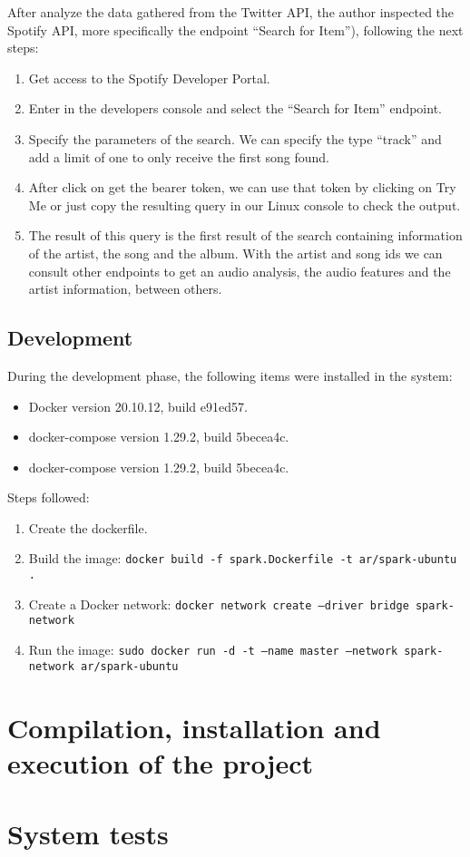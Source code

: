\nonzeroparskip After analyze the data gathered from the Twitter API,  the author inspected the Spotify API, more specifically the endpoint ``Search for Item''), following the next steps:
\begin{enumerate}
	\item Get access to the Spotify Developer Portal.
	\item Enter in the developers console and select the ``Search for Item'' endpoint.
	\item Specify the parameters of the search. We can specify the type ``track'' and add a limit of one to only receive the first song found.
	\item After click on get the bearer token, we can use that token by clicking on Try Me or just copy the resulting query in our Linux console to check the output.
	\item The result of this query is the first result of the search containing information of the artist, the song and the album. With the artist and song ids we can consult other endpoints to get an audio analysis, the audio features and the artist information, between others.
\end{enumerate}

\subsection{Development}
\nonzeroparskip During the development phase, the following items were installed in the system:
\begin{itemize}
	\item Docker version 20.10.12, build e91ed57.
	\item docker-compose version 1.29.2, build 5becea4c.
	\item docker-compose version 1.29.2, build 5becea4c.
\end{itemize}

\nonzeroparskip Steps followed:
\begin{enumerate}
	\item Create the dockerfile.
	\item Build the image:  \texttt{docker build -f spark.Dockerfile -t ar/spark-ubuntu .}
	\item Create a Docker network: \texttt{docker network create --driver bridge spark-network}
	\item Run the image: \texttt{sudo docker run -d -t --name master --network spark-network ar/spark-ubuntu}
\end{enumerate}

\section{Compilation, installation and execution of the project}


\section{System tests}

